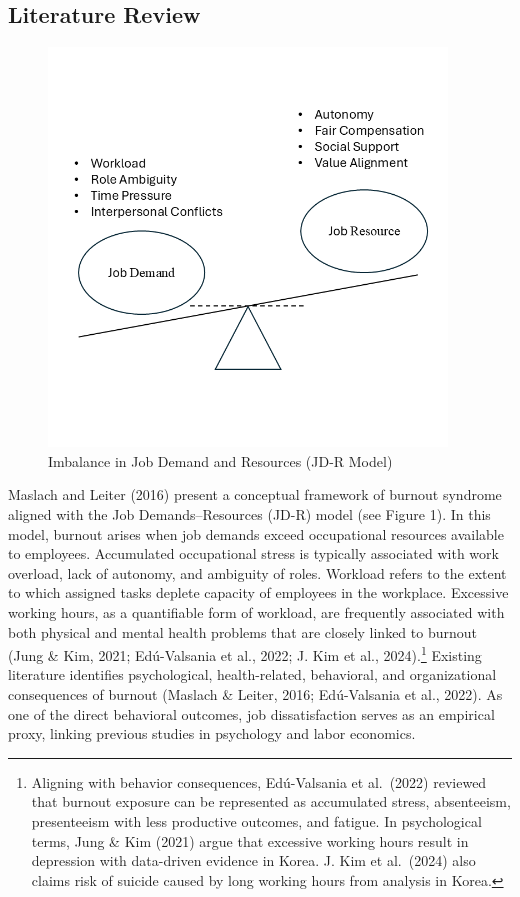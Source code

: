 \documentclass[
  12pt,
]{article}
\begin{document}
\subsection{Literature Review}\label{literature-review}

\begin{figure}
\centering
\includegraphics[width=4.16667in,height=\textheight,keepaspectratio]{figure/Figure.png}
\caption{Imbalance in Job Demand and Resources (JD-R Model)}
\end{figure}

Maslach and Leiter (2016) present a conceptual framework of burnout
syndrome aligned with the Job Demands--Resources (JD-R) model (see
Figure 1). In this model, burnout arises when job demands exceed
occupational resources available to employees. Accumulated occupational
stress is typically associated with work overload, lack of autonomy, and
ambiguity of roles. Workload refers to the extent to which assigned
tasks deplete capacity of employees in the workplace. Excessive working
hours, as a quantifiable form of workload, are frequently associated
with both physical and mental health problems that are closely linked to
burnout (Jung \& Kim, 2021; Edú-Valsania et al., 2022; J. Kim et al.,
2024).\footnote{Aligning with behavior consequences, Edú-Valsania et
  al.~(2022) reviewed that burnout exposure can be represented as
  accumulated stress, absenteeism, presenteeism with less productive
  outcomes, and fatigue. In psychological terms, Jung \& Kim (2021)
  argue that excessive working hours result in depression with
  data-driven evidence in Korea. J. Kim et al.~(2024) also claims risk
  of suicide caused by long working hours from analysis in Korea.}
Existing literature identifies psychological, health-related,
behavioral, and organizational consequences of burnout (Maslach \&
Leiter, 2016; Edú-Valsania et al., 2022). As one of the direct
behavioral outcomes, job dissatisfaction serves as an empirical proxy,
linking previous studies in psychology and labor economics.
\end{document}
